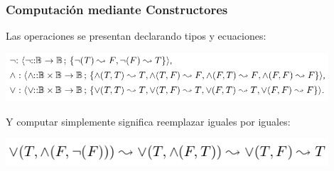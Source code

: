 \documentclass{beamer}
\begin{document}
\begin{frame}
\frametitle{Computaci\'on mediante Constructores}
Las operaciones se presentan declarando tipos y ecuaciones:
\begin{center}
    \includegraphics[width=12cm]{computacion.png}
\end{center}
Y computar simplemente significa reemplazar iguales por iguales:
\begin{center}
    \includegraphics[width=12cm]{computacion2.png}
\end{center}
\end{frame}
\end{document}
